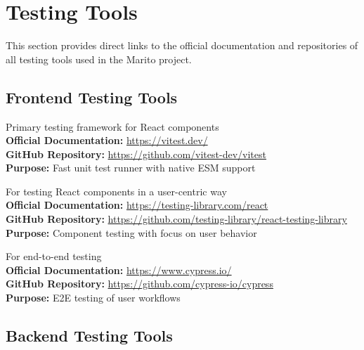 \documentclass[12pt,a4paper]{article}
\begin{document}
\section{Testing Tools}

This section provides direct links to the official documentation and repositories of all testing tools used in the Marito project.

\subsection{Frontend Testing Tools}

\begin{description}[style=nextline]
    \item[Vitest] Primary testing framework for React components \\
    \textbf{Official Documentation:} \url{https://vitest.dev/} \\
    \textbf{GitHub Repository:} \url{https://github.com/vitest-dev/vitest} \\
    \textbf{Purpose:} Fast unit test runner with native ESM support
    
    \item[React Testing Library] For testing React components in a user-centric way \\
    \textbf{Official Documentation:} \url{https://testing-library.com/react} \\
    \textbf{GitHub Repository:} \url{https://github.com/testing-library/react-testing-library} \\
    \textbf{Purpose:} Component testing with focus on user behavior
    
    \item[Cypress] For end-to-end testing \\
    \textbf{Official Documentation:} \url{https://www.cypress.io/} \\
    \textbf{GitHub Repository:} \url{https://github.com/cypress-io/cypress} \\
    \textbf{Purpose:} E2E testing of user workflows
\end{description}

\subsection{Backend Testing Tools}
\end{document}
